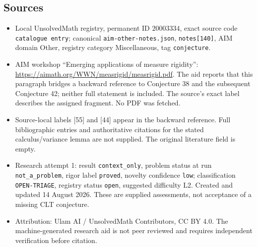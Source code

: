 \documentclass[11pt]{article}
\begin{document}
\subsection{Sources}
\begin{itemize}
\item Local UnsolvedMath registry, permanent ID \(20003334\), exact source code \texttt{catalogue entry}; canonical \texttt{aim-other-notes.json}, \texttt{notes[140]}, AIM domain Other, registry category Miscellaneous, tag \texttt{conjecture}.
\item AIM workshop ``Emerging applications of measure rigidity'': \url{https://aimath.org/WWN/measrigid/measrigid.pdf}. The aid reports that this paragraph bridges a backward reference to Conjecture 38 and the subsequent Conjecture 42; neither full statement is included. The source's exact label describes the assigned fragment. No PDF was fetched.
\item Source-local labels [55] and [44] appear in the backward reference. Full bibliographic entries and authoritative citations for the stated calculus/variance lemma are not supplied. The original literature field is empty.
\item Research attempt 1: result \texttt{context\_only}, problem status at run \texttt{not\_a\_problem}, rigor label \texttt{proved}, novelty confidence \texttt{low}; classification \texttt{OPEN-TRIAGE}, registry status \texttt{open}, suggested difficulty L2. Created and updated 14 August 2026. These are supplied assessments, not acceptance of a missing CLT conjecture.
\item Attribution: Ulam AI / UnsolvedMath Contributors, CC BY 4.0. The machine-generated research aid is not peer reviewed and requires independent verification before citation.
\end{itemize}
\end{document}
